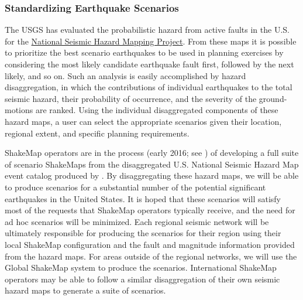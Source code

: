 \documentclass[letterpaper,10pt,english]{sphinxmanual}
\begin{document}
\subsubsection{Standardizing Earthquake Scenarios}
\label{shakemap_archives:standardizing-earthquake-scenarios}
The USGS has evaluated the probabilistic hazard from active faults in
the U.S. for the \href{http://earthquake.usgs.gov/hazards/}{National Seismic Hazard Mapping Project}.
From these maps it is
possible to prioritize the best scenario earthquakes to be used in planning exercises by
considering the most likely candidate earthquake fault first, followed by the next likely,
and so on. Such an analysis is easily accomplished by hazard disaggregation, in which the
contributions of individual earthquakes to the total seismic hazard, their probability of
occurrence, and the severity of the ground-motions are ranked.  Using the individual
disaggregated components of these hazard maps, a user can select the appropriate
scenarios given their location, regional extent, and specific planning requirements.

ShakeMap operators are in the process (early 2016; see {\hyperref[references:thompson2016]{}}) of developing a full suite of
scenario ShakeMaps from the disaggregated U.S. National Seismic Hazard Map event
catalog produced by {\hyperref[references:petersen2014]{}}. By disaggregating these hazard maps, we will
be able to produce scenarios for a substantial number of the potential significant earthquakes
in the United States. It is hoped that these scenarios will satisfy most of
the requests that ShakeMap operators typically receive, and the need for ad
hoc scenarios will be minimized. Each regional seismic network will be ultimately
responsible for producing the scenarios for their region using their local ShakeMap
configuration and the fault and magnitude information provided from the hazard maps.
For areas outside of the regional networks, we will use the Global ShakeMap system to
produce the scenarios. International ShakeMap operators may be able to follow a similar
disaggregation of their own seismic hazard maps to generate a suite of scenarios.
\end{document}
